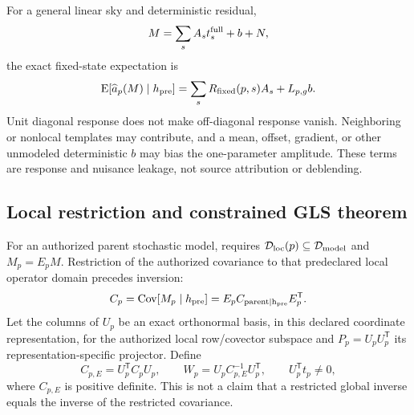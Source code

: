 For a general linear sky and deterministic residual,
\[
 M=\sum_s A_s t_s^{\rm full}+b+N,
\]
the exact fixed-state expectation is
\begin{equation}
 \operatorname E[\widehat a_p(M)\mid h_{\rm pre}]
 =\sum_s R_{\rm fixed}(p,s)A_s+L_{p,g}b.
 \label{eq:general-sky}
\end{equation}
Unit diagonal response does not make off-diagonal response vanish. Neighboring
or nonlocal templates may contribute, and a mean, offset, gradient, or other
unmodeled deterministic $b$ may bias the one-parameter amplitude. These terms
are response and nuisance leakage, not source attribution or deblending.

\subsection{Local restriction and constrained GLS theorem}
\label{sec:optimality}

For an authorized parent stochastic model,  requires
$\mathcal{D}_{\rm loc}(p)\subseteq\mathcal{D}_{\rm model}$ and $M_p=E_pM$. Restriction of
the authorized covariance to that predeclared local operator domain precedes
inversion:
\begin{equation}
 C_p=\operatorname{Cov}[M_p\mid h_{\rm pre}]
 =E_pC_{\rm parent\mid h_{\rm pre}}E_p^{\mathsf T}.
 \label{eq:local-covariance}
\end{equation}
Let the columns of $U_p$ be an exact orthonormal basis, in this declared
coordinate representation, for the authorized local row/covector subspace and
$P_p=U_pU_p^{\mathsf T}$ its representation-specific projector. Define
\[
 C_{p,E}=U_p^{\mathsf T}C_pU_p,
 \qquad
 W_p=U_pC_{p,E}^{-1}U_p^{\mathsf T},
 \qquad U_p^{\mathsf T}t_p\ne0,
\]
where $C_{p,E}$ is positive definite. This is not a claim that a restricted
global inverse equals the inverse of the restricted covariance.

